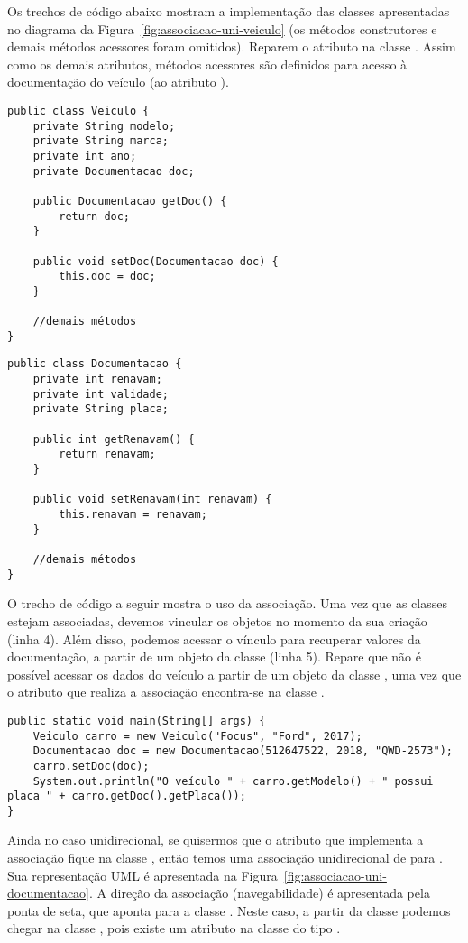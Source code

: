Os trechos de código abaixo mostram a implementação das classes apresentadas no diagrama da Figura~\ref{fig:associacao-uni-veiculo} (os métodos construtores e demais métodos acessores foram omitidos). Reparem o atributo  na classe . Assim como os demais atributos, métodos acessores são definidos para acesso à documentação do veículo (ao atributo ).
 
\begin{verbatim}
public class Veiculo { 
	private String modelo; 
	private String marca; 
	private int ano; 
	private Documentacao doc; 

	public Documentacao getDoc() {
		return doc;
	}
	 
	public void setDoc(Documentacao doc) {
		this.doc = doc;
	}
	
	//demais métodos
}
\end{verbatim}

\begin{verbatim}
public class Documentacao { 
	private int renavam; 
	private int validade;
	private String placa; 
	
	public int getRenavam() {
		return renavam;
	}
	 
	public void setRenavam(int renavam) {
		this.renavam = renavam;
	}
	
	//demais métodos
}
\end{verbatim}

O trecho de código a seguir mostra o uso da associação. Uma vez que as classes estejam associadas, devemos vincular os objetos no momento da sua criação (linha 4). Além disso, podemos acessar o vínculo para recuperar valores da documentação, a partir de um objeto da classe  (linha 5). Repare que não é possível acessar os dados do veículo a partir de um objeto da classe , uma vez que o atributo que realiza a associação encontra-se na classe .

\begin{verbatim}
public static void main(String[] args) { 
	Veiculo carro = new Veiculo("Focus", "Ford", 2017); 
	Documentacao doc = new Documentacao(512647522, 2018, "QWD-2573"); 
	carro.setDoc(doc);
	System.out.println("O veículo " + carro.getModelo() + " possui placa " + carro.getDoc().getPlaca()); 
}
\end{verbatim}

Ainda no caso unidirecional, se quisermos que o atributo que implementa a associação fique na classe , então temos uma associação unidirecional de  para . Sua representação UML é apresentada na Figura~\ref{fig:associacao-uni-documentacao}. A direção da associação (navegabilidade) é apresentada pela ponta de seta, que aponta para a classe . Neste caso, a partir da classe  podemos chegar na classe , pois existe um atributo na classe  do tipo .

